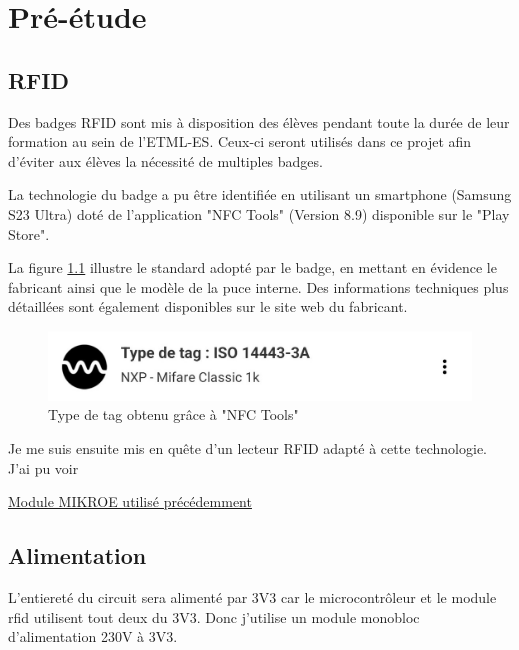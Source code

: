 \cleardoublepage
\chapter{Pré-étude}

\section{RFID}

Des badges RFID sont mis à disposition des élèves pendant toute la durée de leur formation au sein de l'ETML-ES. Ceux-ci seront utilisés dans ce projet afin d'éviter aux élèves la nécessité de multiples badges.

La technologie du badge a pu être identifiée en utilisant un smartphone (Samsung S23 Ultra) doté de l'application "NFC Tools" (Version 8.9) disponible sur le "Play Store".

La figure \ref{fig:screenshotnfctools} illustre le standard adopté par le badge, en mettant en évidence le fabricant ainsi que le modèle de la puce interne. Des informations techniques plus détaillées sont également disponibles sur le site web du fabricant. \cite{MIFAREClassicEV1}

\begin{figure}[h]
	\centering
	\includegraphics[width=0.7\linewidth]{2312_Images/2312_Pre-etude/Screenshot_NFC_Tools}
	\caption{Type de tag obtenu grâce à "NFC Tools"}
	\label{fig:screenshotnfctools}
\end{figure}

Je me suis ensuite mis en quête d'un lecteur RFID adapté à cette technologie. J'ai pu voir 

\href{https://www.mikroe.com/rfid-click}{Module MIKROE utilisé précédemment}

\section{Alimentation}
L'entiereté du circuit sera alimenté par 3V3 car le microcontrôleur et le module rfid utilisent tout deux du 3V3. 
Donc j'utilise un module monobloc d'alimentation 230V à 3V3. 

